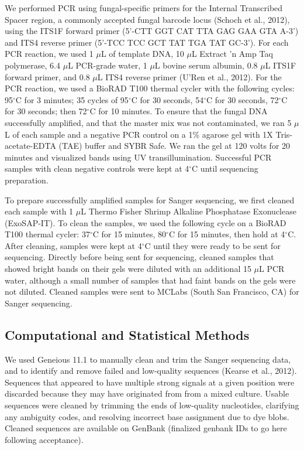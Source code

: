 \documentclass[fleqn,10pt,lineno]{wlpeerj} %
\begin{document}
We performed PCR using fungal-specific primers for the Internal Transcribed Spacer region, a commonly accepted fungal barcode locus (Schoch et al., 2012), using the ITS1F forward primer (5'-CTT GGT CAT TTA GAG GAA GTA A-3') and ITS4 reverse primer (5'-TCC TCC GCT TAT TGA TAT GC-3'). For each PCR reaction, we used 1 \(\mu\)L of template DNA, 10 \(\mu\)L Extract 'n Amp Taq polymerase, 6.4 \(\mu\)L PCR-grade water, 1 \(\mu\)L bovine serum albumin, 0.8 \(\mu\)L ITS1F forward primer, and 0.8 \(\mu\)L ITS4 reverse primer (U'Ren et al., 2012). For the PCR reaction, we used a BioRAD T100 thermal cycler with the following cycles: 95\(^{\circ}\)C for 3 minutes; 35 cycles of 95\(^{\circ}\)C for 30 seconds, 54\(^{\circ}\)C for 30 seconds, 72\(^{\circ}\)C for 30 seconds; then 72\(^{\circ}\)C for 10 minutes. To ensure that the fungal DNA successfully amplified, and that the master mix was not contaminated, we ran 5 \(\mu\)L of each sample and a negative PCR control on a 1\% agarose gel with 1X Tris-acetate-EDTA (TAE) buffer and SYBR Safe. We ran the gel at 120 volts for 20 minutes and visualized bands using UV transillumination. Successful PCR samples with clean negative controls were kept at 4\(^{\circ}\)C until sequencing preparation.

To prepare successfully amplified samples for Sanger sequencing, we first cleaned each sample with 1 \(\mu\)L Thermo Fisher Shrimp Alkaline Phosphatase Exonuclease (ExoSAP-IT). To clean the samples, we used the following cycle on a BioRAD T100 thermal cycler: 37\(^{\circ}\)C for 15 minutes, 80\(^{\circ}\)C for 15 minutes, then hold at 4\(^{\circ}\)C. After cleaning, samples were kept at 4\(^{\circ}\)C until they were ready to be sent for sequencing. Directly before being sent for sequencing, cleaned samples that showed bright bands on their gels were diluted with an additional 15 \(\mu\)L PCR water, although a small number of samples that had faint bands on the gels were not diluted. Cleaned samples were sent to MCLabs (South San Francisco, CA) for Sanger sequencing.

\hypertarget{computational-and-statistical-methods}{%
\subsection*{Computational and Statistical Methods}\label{computational-and-statistical-methods}}

We used Geneious 11.1 to manually clean and trim the Sanger sequencing data, and to identify and remove failed and low-quality sequences (Kearse et al., 2012). Sequences that appeared to have multiple strong signals at a given position were discarded because they may have originated from from a mixed culture. Usable sequences were cleaned by trimming the ends of low-quality nucleotides, clarifying any ambiguity codes, and resolving incorrect base assignment due to dye blobs. Cleaned sequences are available on GenBank (finalized genbank IDs to go here following acceptance).
\end{document}
